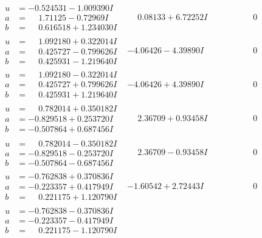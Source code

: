 \documentclass[1p]{elsarticle_modified}
\theoremstyle{definition}
\begin{document}
$$\begin{array}{c|c|c}
\begin{aligned}
u &= -0.524531 - 1.009390 I \\
a &= \phantom{-}1.71125 - 0.72969 I \\
b &= \phantom{-}0.616518 + 1.234030 I\end{aligned}
 & \phantom{-}0.08133 + 6.72252 I & \phantom{-0.000000 } 0 \\ \hline\begin{aligned}
u &= \phantom{-}1.092180 + 0.322014 I \\
a &= \phantom{-}0.425727 - 0.799626 I \\
b &= \phantom{-}0.425931 - 1.219640 I\end{aligned}
 & -4.06426 - 4.39890 I & \phantom{-0.000000 } 0 \\ \hline\begin{aligned}
u &= \phantom{-}1.092180 - 0.322014 I \\
a &= \phantom{-}0.425727 + 0.799626 I \\
b &= \phantom{-}0.425931 + 1.219640 I\end{aligned}
 & -4.06426 + 4.39890 I & \phantom{-0.000000 } 0 \\ \hline\begin{aligned}
u &= \phantom{-}0.782014 + 0.350182 I \\
a &= -0.829518 + 0.253720 I \\
b &= -0.507864 + 0.687456 I\end{aligned}
 & \phantom{-}2.36709 + 0.93458 I & \phantom{-0.000000 } 0 \\ \hline\begin{aligned}
u &= \phantom{-}0.782014 - 0.350182 I \\
a &= -0.829518 - 0.253720 I \\
b &= -0.507864 - 0.687456 I\end{aligned}
 & \phantom{-}2.36709 - 0.93458 I & \phantom{-0.000000 } 0 \\ \hline\begin{aligned}
u &= -0.762838 + 0.370836 I \\
a &= -0.223357 + 0.417949 I \\
b &= \phantom{-}0.221175 + 1.120790 I\end{aligned}
 & -1.60542 + 2.72443 I & \phantom{-0.000000 } 0 \\ \hline\begin{aligned}
u &= -0.762838 - 0.370836 I \\
a &= -0.223357 - 0.417949 I \\
b &= \phantom{-}0.221175 - 1.120790 I\end{aligned}

\end{array}$$
\end{document}
